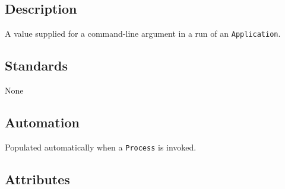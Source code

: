\documentclass[
]{article}
\begin{document}
\subsection{Description}\label{description-2}

A value supplied for a command-line argument in a run of an
\texttt{Application}.

\subsection{Standards}\label{standards-3}

None

\subsection{Automation}\label{automation-3}

Populated automatically when a \texttt{Process} is invoked.

\subsection{Attributes}\label{attributes-4}
\end{document}
